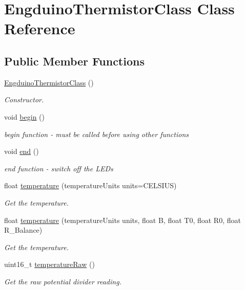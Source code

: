 \hypertarget{class_engduino_thermistor_class}{}\section{Engduino\+Thermistor\+Class Class Reference}
\label{class_engduino_thermistor_class}
\subsection*{Public Member Functions}
\begin{DoxyCompactItemize}
\item 
\hyperlink{group___engduino_thermistor_ga023a60a4d41f9cc75fda1f829dfaee95}{Engduino\+Thermistor\+Class} ()
\begin{DoxyCompactList}\small\item\em Constructor. \end{DoxyCompactList}\item 
void \hyperlink{group___engduino_thermistor_gac1ece244525b24575f56c66398e06fb9}{begin} ()
\begin{DoxyCompactList}\small\item\em begin function -\/ must be called before using other functions \end{DoxyCompactList}\item 
void \hyperlink{group___engduino_thermistor_ga63e9a55ac33ed1d150182c2f1ab3ba74}{end} ()
\begin{DoxyCompactList}\small\item\em end function -\/ switch off the L\+E\+Ds \end{DoxyCompactList}\item 
float \hyperlink{group___engduino_thermistor_gae916afc1aab3688ec3f158e47a52e2ed}{temperature} (temperature\+Units units=C\+E\+L\+S\+I\+U\+S)
\begin{DoxyCompactList}\small\item\em Get the temperature. \end{DoxyCompactList}\item 
float \hyperlink{group___engduino_thermistor_ga84faa940b863fa388fafe0f1ba921f6e}{temperature} (temperature\+Units units, float B, float T0, float R0, float R\+\_\+\+Balance)
\begin{DoxyCompactList}\small\item\em Get the temperature. \end{DoxyCompactList}\item 
uint16\+\_\+t \hyperlink{group___engduino_thermistor_ga1fbfdfec60a80d3628b3494d81b93d53}{temperature\+Raw} ()
\begin{DoxyCompactList}\small\item\em Get the raw potential divider reading. \end{DoxyCompactList}\end{DoxyCompactItemize}


